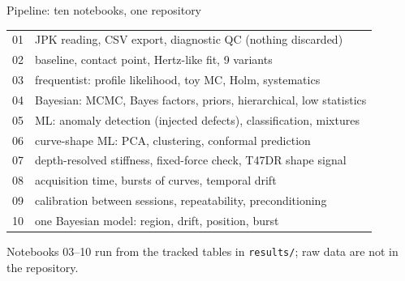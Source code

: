 \documentclass[aspectratio=169,10pt]{beamer}
\begin{document}
\begin{frame}{Pipeline: ten notebooks, one repository}
\small
\begin{tabular}{@{}ll@{}}
\toprule
01 & JPK reading, CSV export, diagnostic QC (nothing discarded)\\
02 & baseline, contact point, Hertz-like fit, 9 variants\\
03 & frequentist: profile likelihood, toy MC, Holm, systematics\\
04 & Bayesian: MCMC, Bayes factors, priors, hierarchical, low statistics\\
05 & ML: anomaly detection (injected defects), classification, mixtures\\
06 & curve-shape ML: PCA, clustering, conformal prediction\\
07 & depth-resolved stiffness, fixed-force check, T47DR shape signal\\
08 & acquisition time, bursts of curves, temporal drift\\
09 & calibration between sessions, repeatability, preconditioning\\
10 & one Bayesian model: region, drift, position, burst\\
\bottomrule
\end{tabular}

\medskip
Notebooks 03--10 run from the tracked tables in \texttt{results/}; raw data are not in the repository.
\end{frame}
\end{document}
